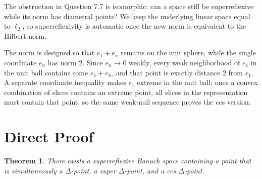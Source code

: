 \documentclass[11pt]{article}
\newtheorem{theorem}{Theorem}
\begin{document}
The obstruction in Question 7.7 is isomorphic: can a space still be
superreflexive while its norm has diametral points?  We keep the underlying
linear space equal to \(\ell_2\), so superreflexivity is automatic once the new
norm is equivalent to the Hilbert norm.

The norm is designed so that \(e_1+e_n\) remains on the unit sphere, while the
single coordinate \(e_n\) has norm \(2\).  Since \(e_n\to0\) weakly, every
weak neighborhood of \(e_1\) in the unit ball contains some \(e_1+e_n\), and
that point is exactly distance \(2\) from \(e_1\).  A separate coordinate
inequality makes \(e_1\) extreme in the unit ball; once a convex combination
of slices contains an extreme point, all slices in the representation must
contain that point, so the same weak-null sequence proves the ccs version.

\section*{Direct Proof}

\begin{theorem}
There exists a superreflexive Banach space containing a point that is
simultaneously a \(\Delta\)-point, a super \(\Delta\)-point, and a ccs
\(\Delta\)-point.
\end{theorem}
\end{document}
